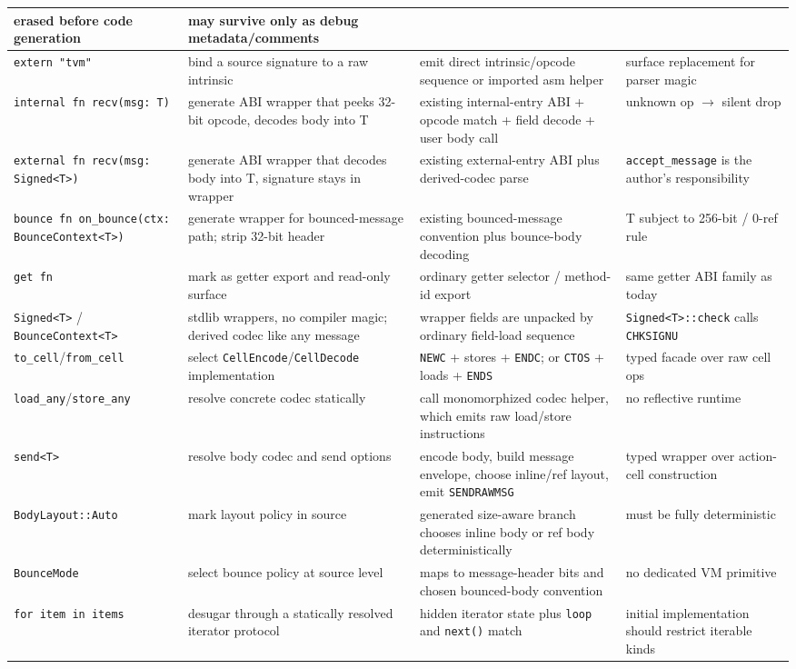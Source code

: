 \documentclass[12pt,oneside]{article}
\begin{document}
\begin{longtable}{|L{0.15\textwidth}|L{0.24\textwidth}|L{0.24\textwidth}|L{0.15\textwidth}|}
erased before code generation &
may survive only as debug metadata/comments \\ \hline
\texttt{extern "tvm"} &
bind a source signature to a raw intrinsic &
emit direct intrinsic/opcode sequence or imported asm helper &
surface replacement for parser magic \\ \hline
\texttt{internal fn recv(msg: T)} &
generate ABI wrapper that peeks 32-bit opcode, decodes body into T &
existing internal-entry ABI + opcode match + field decode + user body call &
unknown op $\to$ silent drop \\ \hline
\texttt{external fn recv(msg: Signed<T>)} &
generate ABI wrapper that decodes body into T, signature stays in wrapper &
existing external-entry ABI plus derived-codec parse &
\texttt{accept\_message} is the author's responsibility \\ \hline
\texttt{bounce fn on\_bounce(ctx: BounceContext<T>)} &
generate wrapper for bounced-message path; strip 32-bit header &
existing bounced-message convention plus bounce-body decoding &
T subject to 256-bit / 0-ref rule \\ \hline
\texttt{get fn} &
mark as getter export and read-only surface &
ordinary getter selector / method-id export &
same getter ABI family as today \\ \hline
\texttt{Signed<T>} / \texttt{BounceContext<T>} &
stdlib wrappers, no compiler magic; derived codec like any message &
wrapper fields are unpacked by ordinary field-load sequence &
\texttt{Signed<T>::check} calls \texttt{CHKSIGNU} \\ \hline
\texttt{to\_cell}/\texttt{from\_cell} &
select \texttt{CellEncode}/\texttt{CellDecode} implementation &
\texttt{NEWC} + stores + \texttt{ENDC}; or \texttt{CTOS} + loads + \texttt{ENDS} &
typed facade over raw cell ops \\ \hline
\texttt{load\_any}/\texttt{store\_any} &
resolve concrete codec statically &
call monomorphized codec helper, which emits raw load/store instructions &
no reflective runtime \\ \hline
\texttt{send<T>} &
resolve body codec and send options &
encode body, build message envelope, choose inline/ref layout, emit \texttt{SENDRAWMSG} &
typed wrapper over action-cell construction \\ \hline
\texttt{BodyLayout::Auto} &
mark layout policy in source &
generated size-aware branch chooses inline body or ref body deterministically &
must be fully deterministic \\ \hline
\texttt{BounceMode} &
select bounce policy at source level &
maps to message-header bits and chosen bounced-body convention &
no dedicated VM primitive \\ \hline
\texttt{for item in items} &
desugar through a statically resolved iterator protocol &
hidden iterator state plus \texttt{loop} and \texttt{next()} match &
initial implementation should restrict iterable kinds \\ \hline
\end{longtable}
\endgroup
\end{document}
